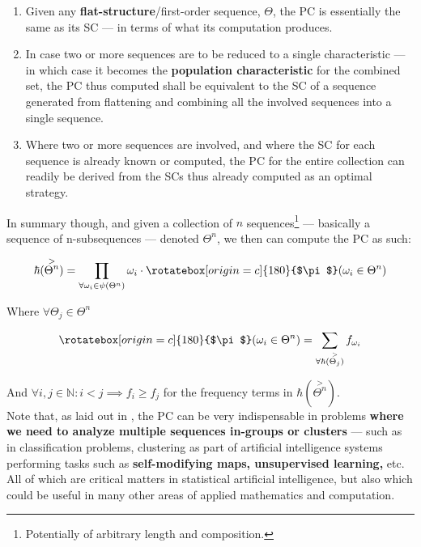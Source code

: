 \documentclass[a4paper, 18pt]{book} %
\newcommand{\invpi}{\rotatebox[origin=c]{180}{$\pi$}}
\begin{document}
\begin{appendices}
\begin{enumerate}
\item Given any \textbf{flat-structure}/first-order sequence, $\Theta$, the PC is essentially the same as its SC --- in terms of what its computation produces.
\item In case two or more sequences are to be reduced to a single characteristic --- in which case it becomes the \textbf{population characteristic} for the combined set, the PC thus computed shall be equivalent to the SC of a sequence generated from flattening and combining all the involved sequences into a single sequence.
\item Where two or more sequences are involved, and where the SC for each sequence is already known or computed, the PC for the entire collection can readily be derived from the SCs thus already computed as an optimal strategy.
\end{enumerate}

In summary though, and given a collection of $n$ sequences\footnote{Potentially of arbitrary length and composition.} --- basically a sequence of n-subsequences --- denoted $\Theta^n$, we then can compute the PC as such:

\vspace{1em}
\begin{equation}
\label{EQPOPCHARb}
\hbar(\overset{>}{\Theta^n}) = \prod\limits_{\forall \omega_i \in \psi(\Theta^n)} \omega_i \cdot \invpi(\omega_i \in \Theta^n)
\end{equation}
\vspace{1em}

Where $\forall \Theta_j \in \Theta^n$

\vspace{1em}
\begin{equation}
\invpi(\omega_i \in \Theta^n) = \sum\limits_{\forall \hbar(\overset{>}{\Theta_j})} f_{\omega_i}
\end{equation}
\vspace{1em}

And $\forall i, j \in \mathbb{N}: i < j \implies f_i \geq f_j$ for the frequency terms in $\hbar(\overset{>}{\Theta^n})$.\\


Note that, as laid out in \cite{lutalo_2025_trans_genetics}, the PC can be very indispensable in problems \textbf{where we need to analyze multiple sequences in-groups or clusters} --- such as in classification problems, clustering as part of artificial intelligence systems performing tasks such as \textbf{self-modifying maps, unsupervised learning,} etc. All of which are critical matters in statistical artificial intelligence, but also which could be useful in many other areas of applied mathematics and computation.\\


\end{appendices}
\end{document}
